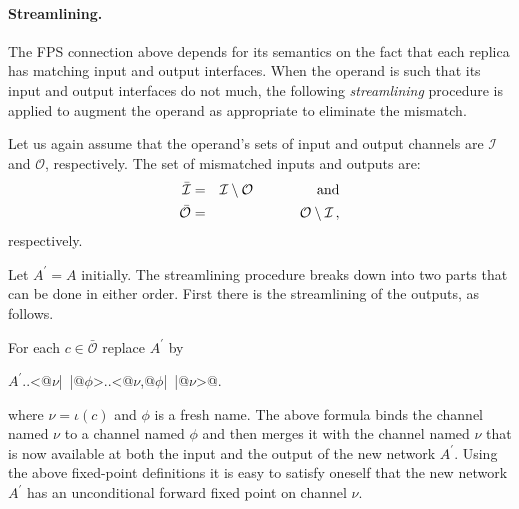 \documentclass[11pt]{report}
\begin{document}
\paragraph{Streamlining.}

The FPS connection above depends for its semantics on the fact that each replica has matching input and output interfaces. When the operand is such that its input and output interfaces do not much, the following {\em streamlining} procedure is applied to augment the operand as appropriate to eliminate the mismatch.

Let us again assume that the operand's sets of input and output channels are $\mathcal I$ and $\mathcal O$, respectively. The set of mismatched inputs and outputs are:
\begin{eqnarray*}
\bar{\mathcal I} & = & {\mathcal I}\setminus {\mathcal O}\;\;\hspace{4em}\hbox{and} \\ \nonumber
\bar{\mathcal O} & = & {\mathcal O}\setminus {\mathcal I}\,, \nonumber
\end{eqnarray*}
respectively.

Let $A^\prime =A$ initially. The streamlining procedure breaks down into two parts
that can be done in either order. First there is the streamlining of the outputs, as follows.

For each $c\in \bar{\mathcal O}$
replace $A^\prime$ by
\begin{center}
$A^\prime$\verb@..<@$\nu$\verb@|~|@$\phi$\verb@>..<@$\nu$\verb@,@$\phi$\verb@|~|@$\nu$\verb@>@.
\end{center}
where $\nu=\iota(c)$ and $\phi$ is a fresh name. The above formula binds the channel named $\nu$ to a channel named $\phi$ and then merges it with the channel named $\nu$ that is now available at both the input and the output of the new network $A^\prime$. Using the above fixed-point definitions it is easy to satisfy oneself that the new network $A^\prime$ has an unconditional forward fixed point on channel $\nu$.
\end{document}
